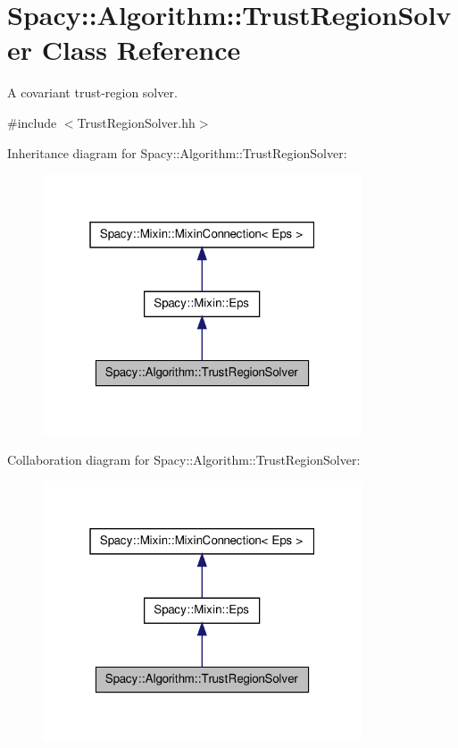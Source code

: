 \hypertarget{classSpacy_1_1Algorithm_1_1TrustRegionSolver}{\section{\-Spacy\-:\-:\-Algorithm\-:\-:\-Trust\-Region\-Solver \-Class \-Reference}
\label{classSpacy_1_1Algorithm_1_1TrustRegionSolver}
}


\-A covariant trust-\/region solver.  




{\ttfamily \#include $<$\-Trust\-Region\-Solver.\-hh$>$}



\-Inheritance diagram for \-Spacy\-:\-:\-Algorithm\-:\-:\-Trust\-Region\-Solver\-:
\nopagebreak
\begin{figure}[H]
\begin{center}
\leavevmode
\includegraphics[width=268pt]{classSpacy_1_1Algorithm_1_1TrustRegionSolver__inherit__graph}
\end{center}
\end{figure}


\-Collaboration diagram for \-Spacy\-:\-:\-Algorithm\-:\-:\-Trust\-Region\-Solver\-:
\nopagebreak
\begin{figure}[H]
\begin{center}
\leavevmode
\includegraphics[width=268pt]{classSpacy_1_1Algorithm_1_1TrustRegionSolver__coll__graph}
\end{center}
\end{figure}
